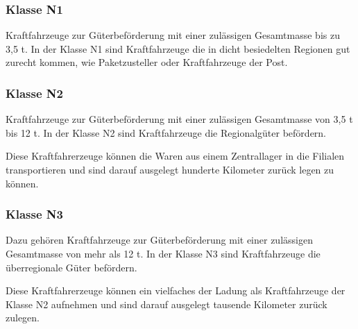 \subsubsection{Klasse N1}
Kraftfahrzeuge zur Güterbeförderung mit einer zulässigen Gesamtmasse bis zu 3,5 \ac{t}.
In der Klasse N1 sind Kraftfahrzeuge die in dicht besiedelten Regionen gut zurecht kommen, wie Paketzusteller oder Kraftfahrzeuge der Post.


\subsubsection{Klasse N2}
Kraftfahrzeuge zur Güterbeförderung mit einer zulässigen Gesamtmasse von 3,5 \ac{t} bis 12 \ac{t}.
In der Klasse N2 sind Kraftfahrzeuge die Regionalgüter befördern.

Diese Kraftfahrerzeuge können die Waren aus einem Zentrallager in die Filialen transportieren
und sind darauf ausgelegt hunderte Kilometer zurück legen zu können.

\subsubsection{Klasse N3}
Dazu gehören Kraftfahrzeuge zur Güterbeförderung mit einer zulässigen Gesamtmasse von mehr als 12 \ac{t}.
In der Klasse N3 sind Kraftfahrzeuge die überregionale Güter befördern.

Diese Kraftfahrerzeuge können ein vielfaches der Ladung als Kraftfahrzeuge der Klasse N2 aufnehmen
und sind darauf ausgelegt tausende Kilometer zurück zulegen.

